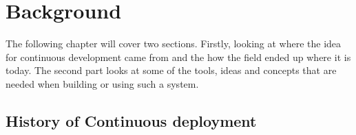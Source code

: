 %
%
%
%
%
%

\section{Background}

The following chapter will cover two sections. Firstly, looking at where the idea for continuous development came from and the how the field ended up where it is today. The second part looks at some of the tools, ideas and concepts that are needed when building or using such a system.

\subsection{History of Continuous deployment}


